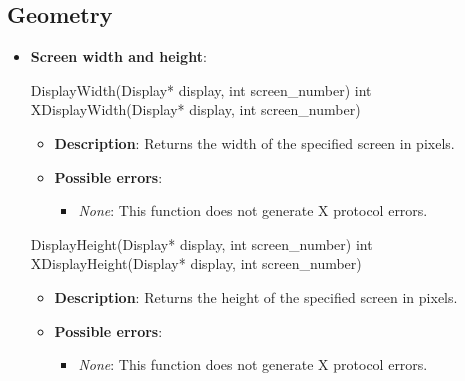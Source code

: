 \documentclass{report}
\begin{document}
    \subsection{Geometry}
    \begin{itemize}
        \item \textbf{Screen width and height}: 
            \bigbreak \noindent 
        \begin{cppcode}
            DisplayWidth(Display* display, int screen_number)
            int XDisplayWidth(Display* display, int screen_number)
        \end{cppcode}
        \begin{itemize}
            \item \textbf{Description}: Returns the width of the specified screen in pixels.
            \item \textbf{Possible errors}:
                \begin{itemize}
                    \item \textit{None}: This function does not generate X protocol errors.
                \end{itemize}
        \end{itemize}
        \bigbreak \noindent 
        \begin{cppcode}
            DisplayHeight(Display* display, int screen_number)
            int XDisplayHeight(Display* display, int screen_number)
        \end{cppcode}
        \begin{itemize}
            \item \textbf{Description}: Returns the height of the specified screen in pixels.
            \item \textbf{Possible errors}:
                \begin{itemize}
                    \item \textit{None}: This function does not generate X protocol errors.
                \end{itemize}
        \end{itemize}


    \end{itemize}

    \pagebreak 
\end{document}
